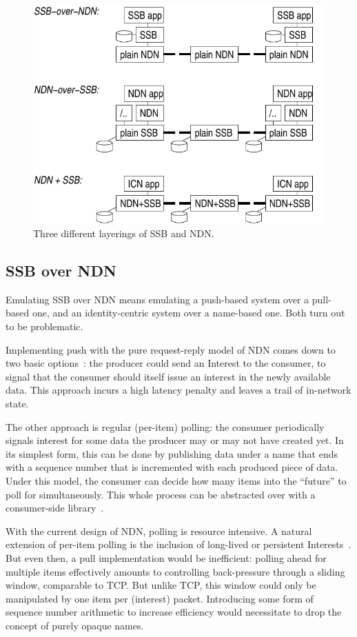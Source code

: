\documentclass[9pt,sigconf]{acmart}
\begin{document}
\begin{figure}[htb]
  \raggedright
  \includegraphics[width=0.9\columnwidth]{figs/ssb-and-ndn.pdf}
  \caption{\label{fig:ssb-and-ndn}Three different layerings of SSB and NDN.}
\end{figure}

\subsection{SSB over NDN}
\label{ssect:ssb-over-ndn}

Emulating SSB over NDN means emulating a push-based system over a
pull-based one, and an identity-centric system over a name-based
one. Both turn out to be problematic.

Implementing push with the pure request-reply model of NDN comes down
to two basic options~\cite{carzaniga2011pubsub}: the producer could
send an Interest to the consumer, to signal that the consumer should
itself issue an interest in the newly available data. This approach
incurs a high latency penalty and leaves a trail of in-network state.

The other approach is regular (per-item) polling: the consumer
periodically signals interest for some data the producer may or may
not have created yet. In its simplest form, this can be done by
publishing data under a name that ends with a sequence number that is
incremented with each produced piece of data. Under this model, the
consumer can decide how many items into the ``future'' to poll for
simultaneously. This whole process can be abstracted over with a
consumer-side
library~\cite{moiseenko2014consumer,sardara2018transport}.

With the current design of NDN, polling is resource intensive. A
natural extension of per-item polling is the inclusion of long-lived
or persistent Interests~\cite{moll2018persistent}. But even then, a
pull implementation would be inefficient: polling ahead for multiple
items effectively amounts to controlling back-pressure through a
sliding window, comparable to TCP. But unlike TCP, this window could
only be manipulated by one item per (interest) packet. Introducing
some form of sequence number arithmetic to increase efficiency would
necessitate to drop the concept of purely opaque names.
\end{document}
